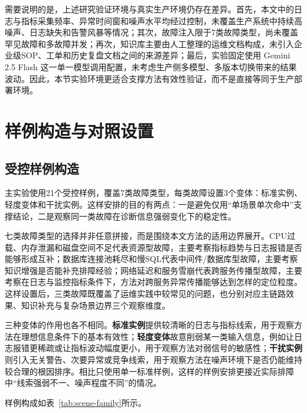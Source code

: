 需要说明的是，上述研究验证环境与真实生产环境仍存在差异。首先，本文中的日志与指标采集频率、异常时间窗和噪声水平均经过控制，未覆盖生产系统中持续高噪声、日志缺失和告警风暴等情况；其次，故障注入限于7类故障类型，尚未覆盖罕见故障和多故障并发；再次，知识库主要由人工整理的运维文档构成，未引入企业级SOP、工单和历史复盘文档之间的来源差异；最后，实验固定使用 Gemini 2.5 Flash 这一单一模型调用配置，未考虑生产侧多模型、多版本切换带来的结果波动。因此，本节实验环境更适合支撑方法有效性验证，而不是直接等同于生产部署环境。

\section{样例构造与对照设置}

\subsection{受控样例构造}

主实验使用21个受控样例，覆盖7类故障类型，每类故障设置3个变体：标准实例、轻度变体和干扰实例。这样安排的目的有两点：一是避免仅用“单场景单次命中”支撑结论，二是观察同一类故障在诊断信息强弱变化下的稳定性。

七类故障类型的选择并非任意拼接，而是围绕本文方法的适用边界展开。CPU过载、内存泄漏和磁盘空间不足代表资源型故障，主要考察指标趋势与日志报错是否能够形成互补；数据库连接池耗尽和慢SQL代表中间件/数据库型故障，主要考察知识增强是否能补充排障经验；网络延迟和服务雪崩代表跨服务传播型故障，主要考察在日志与监控指标条件下，方法对跨服务异常传播能够达到怎样的定位粒度。这样设置后，三类故障既覆盖了运维实践中较常见的问题，也分别对应主链路效果、知识补充与复杂场景边界三个观察维度。

三种变体的作用也各不相同。\textbf{标准实例}提供较清晰的日志与指标线索，用于观察方法在理想信息条件下的基本有效性；\textbf{轻度变体}故意削弱某一类输入信息，例如让日志报错更稀疏或让指标波动幅度更小，用于观察方法对弱信号的敏感性；\textbf{干扰实例}则引入无关警告、次要异常或竞争线索，用于观察方法在噪声环境下是否仍能维持较合理的根因排序。相比只使用单一标准样例，这样的样例安排更接近实际排障中“线索强弱不一、噪声程度不同”的情况。

样例构成如表~\ref{tab:scene-family}所示。

